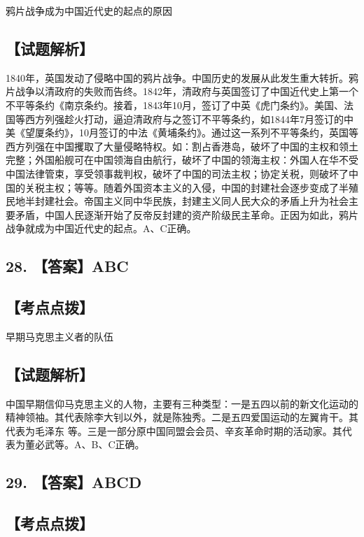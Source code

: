 \documentclass[UTF8,11pt]{ctexart}
\begin{document}
鸦片战争成为中国近代史的起点的原因


\subsection*{【试题解析】}

1840年，英国发动了侵略中国的鸦片战争。中国历史的发展从此发生重大转折。鸦片战争以清政府的失败而告终。1842年，清政府与英国签订了中国近代史上第一个不平等条约《南京条约。接着，1843年10月，签订了中英《虎门条约》。美国、法国等西方列强趁火打动，逼迫清政府与之签订不平等条约，如1844年7月签订的中美《望厦条约》，10月签订的中法《黄埔条约》。通过这一系列不平等条约，英国等西方列强在中国攫取了大量侵略特权。如：割占香港岛，破坏了中国的主权和领土完整；外国船舰可在中国领海自由航行，破坏了中国的领海主权：外国人在华不受中国法律管束，享受领事裁判权，破坏了中国的司法主权；协定关税，则破坏了中国的关税主权；等等。随着外国资本主义的入侵，中国的封建社会逐步变成了半殖 民地半封建社会。帝国主义同中华民族，封建主义同人民大众的矛盾上升为社会主要矛盾，中国人民逐渐开始了反帝反封建的资产阶级民主革命。正因为如此，鸦片战争就成为中国近代史的起点。A、C正确。


\subsection*{28. 【答案】ABC}

\subsection*{【考点点拨】}

早期马克思主义者的队伍


\subsection*{【试题解析】}

中国早期信仰马克思主义的人物，主要有三种类型：一是五四以前的新文化运动的 精神领袖。其代表除李大钊以外，就是陈独秀。二是五四爱国运动的左翼肯干。其代表为毛泽东 等。三是一部分原中国同盟会会员、辛亥革命时期的活动家。其代表为董必武等。A、B、C正确。


\subsection*{29. 【答案】ABCD}

\subsection*{【考点点拨】}
\end{document}
